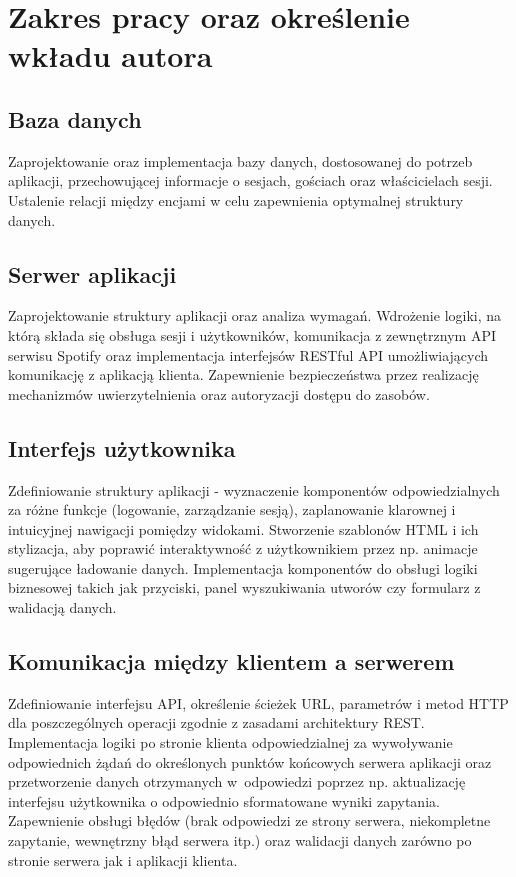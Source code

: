 \section{Zakres pracy oraz określenie wkładu autora}
\subsection{Baza danych}
Zaprojektowanie oraz implementacja bazy danych, dostosowanej do potrzeb aplikacji, przechowującej informacje o sesjach, gościach oraz właścicielach sesji. Ustalenie relacji między encjami w celu zapewnienia optymalnej struktury danych.
\subsection{Serwer aplikacji}
Zaprojektowanie struktury aplikacji oraz analiza wymagań. Wdrożenie logiki, na którą składa się obsługa sesji i użytkowników, komunikacja z zewnętrznym API serwisu Spotify oraz implementacja interfejsów RESTful API umożliwiających komunikację z aplikacją klienta. Zapewnienie bezpieczeństwa przez realizację mechanizmów uwierzytelnienia oraz autoryzacji dostępu do zasobów. 
\subsection{Interfejs użytkownika}
Zdefiniowanie struktury aplikacji - wyznaczenie komponentów odpowiedzialnych za różne funkcje (logowanie, zarządzanie sesją), zaplanowanie klarownej i intuicyjnej nawigacji pomiędzy widokami. Stworzenie szablonów HTML i ich stylizacja, aby poprawić interaktywność z użytkownikiem przez np. animacje sugerujące ładowanie danych. Implementacja komponentów do obsługi logiki biznesowej takich jak przyciski, panel wyszukiwania utworów czy formularz z walidacją danych.
\subsection{Komunikacja między klientem a serwerem}
Zdefiniowanie interfejsu API, określenie ścieżek URL, parametrów i metod HTTP dla poszczególnych operacji zgodnie z zasadami architektury REST. Implementacja logiki po stronie klienta odpowiedzialnej za wywoływanie odpowiednich żądań do określonych punktów końcowych serwera aplikacji oraz przetworzenie danych otrzymanych w~odpowiedzi poprzez np. aktualizację interfejsu użytkownika o odpowiednio sformatowane wyniki zapytania. Zapewnienie obsługi błędów (brak odpowiedzi ze strony serwera, niekompletne zapytanie, wewnętrzny błąd serwera itp.) oraz walidacji danych zarówno po stronie serwera jak i aplikacji klienta. 
